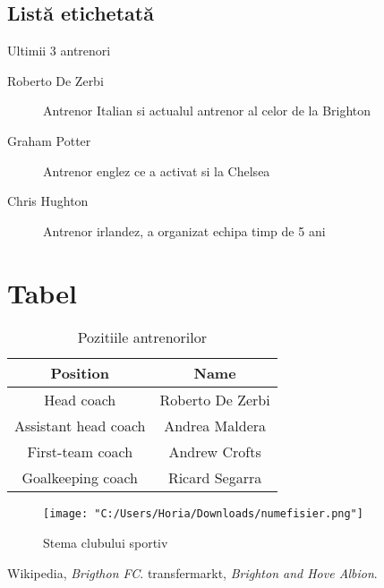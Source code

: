 \documentclass{article}
\begin{document}
\subsection{Listă etichetată}
\hspace{0.5cm}Ultimii 3 antrenori
\begin{description}
    \item[Roberto De Zerbi] Antrenor Italian si actualul antrenor al celor de la Brighton
    \item[Graham Potter] Antrenor englez ce a activat si la Chelsea
    \item[Chris Hughton] Antrenor irlandez, a organizat echipa timp de 5 ani
\end{description}



\section{Tabel}
\begin{table}[h]
    \centering
    \begin{tabular}{|c|c|}
        \hline
        Position & Name \\
        \hline
        Head coach & Roberto De Zerbi \\
	Assistant head coach & Andrea Maldera\\
	First-team coach & Andrew Crofts\\
	Goalkeeping coach & Ricard Segarra\\
	\hline
    \end{tabular}
    \caption{Pozitiile antrenorilor}
    \label{tab:tabel1}
\end{table}


\begin{figure}
	\centering
    \texttt{[image: "C:/Users/Horia/Downloads/numefisier.png"]}
    \caption{Stema clubului sportiv}
    \label{fig:figura1}
\end{figure}

\begin{thebibliography}{9}
     Wikipedia, \emph{Brigthon FC}.
     transfermarkt, \emph{Brighton and Hove Albion}.
\end{thebibliography}
\end{document}
